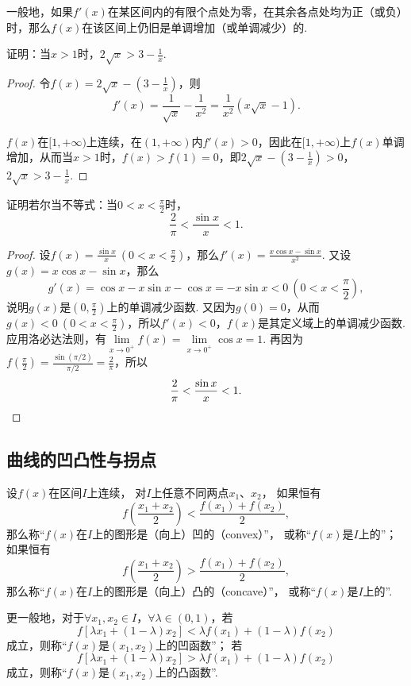 一般地，如果\(f'(x)\)在某区间内的有限个点处为零，在其余各点处均为正（或负）时，那么\(f(x)\)在该区间上仍旧是单调增加（或单调减少）的.

\begin{example}
证明：当\(x > 1\)时，\(2 \sqrt{x} > 3 - \frac{1}{x}\).
\begin{proof}
令\(f(x) = 2 \sqrt{x} - \left(3 - \frac{1}{x}\right)\)，则\[
f'(x) = \frac{1}{\sqrt{x}} - \frac{1}{x^2}
= \frac{1}{x^2} (x \sqrt{x} - 1).
\]

\(f(x)\)在\([1,+\infty)\)上连续，在\((1,+\infty)\)内\(f'(x) > 0\)，因此在\([1,+\infty)\)上\(f(x)\)单调增加，从而当\(x > 1\)时，\(f(x) > f(1) = 0\)，即\(2 \sqrt{x} - \left(3 - \frac{1}{x}\right) > 0\)，\(2 \sqrt{x} > 3 - \frac{1}{x}\).
\end{proof}
\end{example}

\begin{example}
证明若尔当不等式：当\(0<x<\frac{\pi}{2}\)时，\begin{equation}\label{equation:微分中值定理.若尔当不等式}
\frac{2}{\pi} < \frac{\sin x}{x} < 1.
\end{equation}
\begin{proof}
设\(f(x) = \frac{\sin x}{x}\ (0<x<\frac{\pi}{2})\)，那么\(f'(x) = \frac{x\cos x - \sin x}{x^2}\).
又设\(g(x) = x \cos x - \sin x\)，那么\[
g'(x) = \cos x - x \sin x - \cos x = -x \sin x < 0\ (0<x<\frac{\pi}{2}),
\]说明\(g(x)\)是\((0,\frac{\pi}{2})\)上的单调减少函数.
又因为\(g(0) = 0\)，从而\(g(x) < 0\ (0<x<\frac{\pi}{2})\)，所以\(f'(x) < 0\)，\(f(x)\)是其定义域上的单调减少函数.
应用洛必达法则，有\(\lim\limits_{x\to0^+} f(x) = \lim\limits_{x\to0^+} \cos x = 1\).
再因为\(f(\frac{\pi}{2}) = \frac{\sin(\pi/2)}{\pi/2} = \frac{2}{\pi}\)，所以\[
\frac{2}{\pi} < \frac{\sin x}{x} < 1.
\qedhere
\]
\end{proof}
\end{example}


\subsection{曲线的凹凸性与拐点}
\begin{definition}[曲线的凹凸性]
设\(f(x)\)在区间\(I\)上连续，%
对\(I\)上任意不同两点\(x_1\)、\(x_2\)，%
如果恒有\[f\left(\frac{x_1+x_2}{2}\right) < \frac{f(x_1)+f(x_2)}{2},\]
那么称“\(f(x)\)在\(I\)上的图形是（向上）凹的（convex）”，%
或称“\(f(x)\)是\(I\)上的”；
如果恒有\[f\left(\frac{x_1+x_2}{2}\right) > \frac{f(x_1)+f(x_2)}{2},\]
那么称“\(f(x)\)在\(I\)上的图形是（向上）凸的（concave）”，%
或称“\(f(x)\)是\(I\)上的”.
\end{definition}
更一般地，对于\(\forall x_1,x_2 \in I\)，\(\forall \lambda \in (0,1)\)，若\[
f[\lambda x_1 + (1-\lambda) x_2] < \lambda f(x_1) + (1 - \lambda) f(x_2)
\]成立，则称“\(f(x)\)是\((x_1,x_2)\)上的凹函数”；
若\[
f[\lambda x_1 + (1-\lambda) x_2] > \lambda f(x_1) + (1-\lambda) f(x_2)
\]成立，则称“\(f(x)\)是\((x_1,x_2)\)上的凸函数”.

